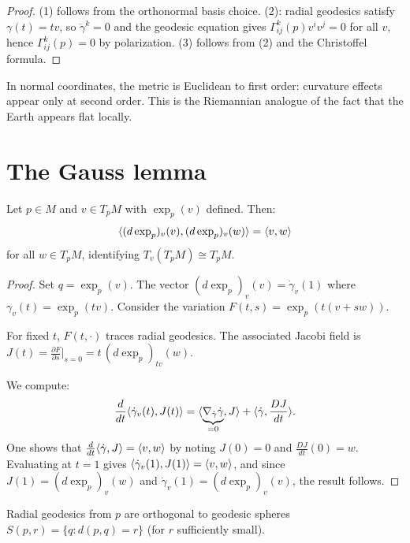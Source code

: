 \begin{proof}
(1) follows from the orthonormal basis choice. (2): radial geodesics satisfy
$\gamma(t) = tv$, so $\ddot\gamma^k = 0$ and the geodesic equation gives
$\Gamma^k_{ij}(p) v^i v^j = 0$ for all $v$, hence $\Gamma^k_{ij}(p) = 0$ by
polarization. (3) follows from (2) and the Christoffel formula.
\end{proof}

\begin{intuition}[title=\textbf{Normal coordinates = linearization of geometry}]
In normal coordinates, the metric is Euclidean to first order: curvature effects
appear only at second order. This is the Riemannian analogue of the fact that
the Earth appears flat locally.
\end{intuition}

\section{The Gauss lemma}

\begin{lemma}
\label{lem:gauss}
Let $p \in M$ and $v \in T_pM$ with $\exp_p(v)$ defined. Then:
\[
    \langle (d\exp_p)_v(v), (d\exp_p)_v(w) \rangle = \langle v, w \rangle
\]
for all $w \in T_pM$, identifying $T_v(T_pM) \cong T_pM$.
\end{lemma}

\begin{proof}
Set $q = \exp_p(v)$. The vector $(d\exp_p)_v(v) = \dot\gamma_v(1)$ where
$\gamma_v(t) = \exp_p(tv)$. Consider the variation $F(t,s) = \exp_p(t(v + sw))$.

For fixed $t$, $F(t, \cdot)$ traces radial geodesics. The associated Jacobi
field is $J(t) = \frac{\partial F}{\partial s}\big|_{s=0} = t\, (d\exp_p)_{tv}(w)$.

We compute:
\[
    \frac{d}{dt}\langle \dot\gamma_v(t), J(t) \rangle
    = \langle \underbrace{\nabla_{\dot\gamma}\dot\gamma}_{=0}, J \rangle
    + \langle \dot\gamma, \frac{DJ}{dt} \rangle.
\]
One shows that $\frac{d}{dt}\langle \dot\gamma, J \rangle = \langle v, w \rangle$ by noting
$J(0) = 0$ and $\frac{DJ}{dt}(0) = w$. Evaluating at $t = 1$ gives
$\langle \dot\gamma_v(1), J(1) \rangle = \langle v, w \rangle$, and since
$J(1) = (d\exp_p)_v(w)$ and $\dot\gamma_v(1) = (d\exp_p)_v(v)$, the result follows.
\end{proof}

\begin{corollary}
Radial geodesics from $p$ are orthogonal to geodesic spheres
$S(p, r) = \{q : d(p,q) = r\}$ (for $r$ sufficiently small).
\end{corollary}

